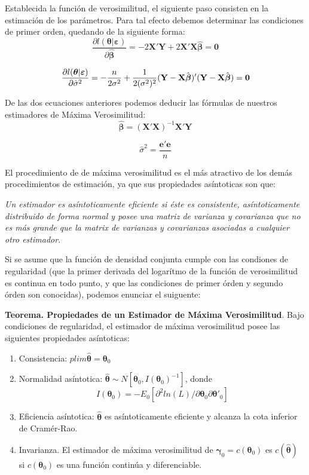 \documentclass[
  a4paper,
]{article}
\begin{document}
Establecida la función de verosimilitud, el siguiente paso consisten en
la estimación de los parámetros. Para tal efecto debemos determinar las
condiciones de primer orden, quedando de la siguiente forma: \[
\frac{\partial l(\boldsymbol{\theta} | \boldsymbol{\varepsilon})}{\partial \hat{\boldsymbol \beta}} = -2{\mathbf{X'Y}} + 2{\mathbf{X'X}} \hat{\boldsymbol{\beta}} = \mathbf{0}
\]

\[
\frac{\partial l(\boldsymbol{\theta} | \boldsymbol{\varepsilon})}{\partial \hat{\sigma}^2} = - \frac{n}{2 \sigma^2} + \frac{1}{2 (\sigma^2)^2} (\mathbf{Y} - \mathbf{X} \hat{\boldsymbol \beta})'(\mathbf{Y} - \mathbf{X} \hat{\boldsymbol \beta}) = \bf{0}
\]

De las dos ecuaciones anteriores podemos deducir las fórmulas de
nuestros estimadores de Máxima Verosimilitud: \[
\hat{\boldsymbol{\beta}} = (\mathbf{X'X})^{-1}\mathbf{X'Y}
\]

\[
\hat{\sigma}^2 = \frac{\mathbf{e'e}}{n}
\]

El procedimiento de de máxima verosimilitud es el más atractivo de los
demás procedimientos de estimación, ya que sus propiedades asíntoticas
son que:

\textit{Un estimador es asíntoticamente eficiente si éste es consistente, asíntoticamente distribuido de forma normal y posee una matriz de varianza y covarianza que no es más grande que la matrix de varianzas y covarianzas asociadas a cualquier otro estimador.}

Si se asume que la función de densidad conjunta cumple con las condiones
de regularidad (que la primer derivada del logarítmo de la función de
verosimilitud es continua en todo punto, y que las condiciones de primer
órden y segundo órden son conocidas), podemos enunciar el suiguente:

\textbf{Teorema. Propiedades de un Estimador de Máxima Verosimilitud}.
Bajo condiciones de regularidad, el estimador de máxima verosimilitud
posee las siguientes propiedades asíntoticas:

\begin{enumerate}
\item Consistencia: $plim \hat{\boldsymbol{\theta}} = \boldsymbol{\theta}_0$ 
\item Normalidad asíntotica: $\hat{\boldsymbol{\theta}} \sim N[\boldsymbol{\theta}_0, I(\boldsymbol{\theta}_0)^{-1}]$, donde
\[
I(\boldsymbol{\theta}_0) = -E_0[\partial^2 ln(L)/\partial \boldsymbol{\theta}_0 \partial \boldsymbol{\theta}'_0]
\]
\item Eficiencia asíntotica: $\hat{\boldsymbol{\theta}}$ es asíntoticamente eficiente y alcanza la cota inferior de Cramér-Rao.
\item Invarianza. El estimador de máxima verosimilitud de $\boldsymbol{\gamma}_0 = c(\boldsymbol{\theta}_0)$ es $c(\hat{\boldsymbol{\theta}})$ si $c(\boldsymbol{\theta}_0)$ es una función continúa y diferenciable.
\end{enumerate}
\end{document}
